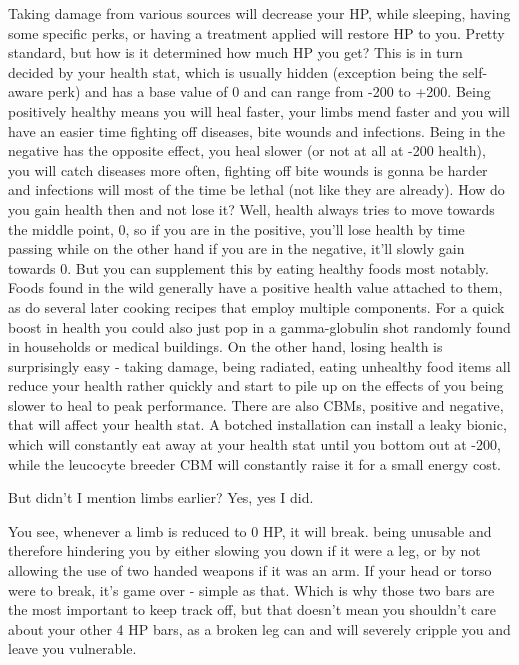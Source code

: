Taking damage from various sources will decrease your HP, while sleeping, having some specific perks, or having a treatment applied will restore HP to you. Pretty standard, but how is it determined how much HP you get? This is in turn decided by your health stat, which is usually hidden (exception being the self-aware perk) and has a base value of 0 and can range from -200 to +200. Being positively healthy means you will heal faster, your limbs mend faster and you will have an easier time fighting off diseases, bite wounds and infections. Being in the negative has the opposite effect, you heal slower (or not at all at -200 health), you will catch diseases more often, fighting off bite wounds is gonna be harder and infections will most of the time be lethal (not like they are already). How do you gain health then and not lose it? Well, health always tries to move towards the middle point, 0, so if you are in the positive, you'll lose health by time passing while on the other hand if you are in the negative, it'll slowly gain towards 0. But you can supplement this by eating healthy foods most notably. Foods found in the wild generally have a positive health value attached to them, as do several later cooking recipes that employ multiple components. For a quick boost in health you could also just pop in a gamma-globulin shot randomly found in households or medical buildings. On the other hand, losing health is surprisingly easy - taking damage, being radiated, eating unhealthy food items all reduce your health rather quickly and start to pile up on the effects of you being slower to heal to peak performance. There are also CBMs, positive and negative, that will affect your health stat. A botched installation can install a leaky bionic, which will constantly eat away at your health stat until you bottom out at -200, while the leucocyte breeder CBM will constantly raise it for a small energy cost.

But didn't I mention limbs earlier? Yes, yes I did.

You see, whenever a limb is reduced to 0 HP, it will break. being unusable and therefore hindering you by either slowing you down if it were a leg, or by not allowing the use of two handed weapons if it was an arm. If your head or torso were to break, it's game over - simple as that. Which is why those two bars are the most important to keep track off, but that doesn't mean you shouldn't care about your other 4 HP bars, as a broken leg can and will severely cripple you and leave you vulnerable.

